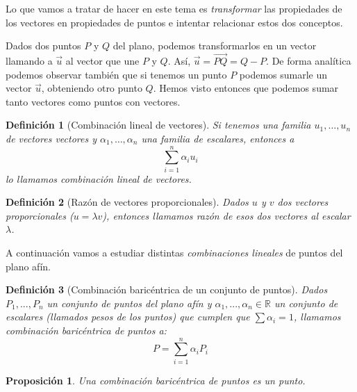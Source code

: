 \documentclass[11pt, a4paper, titlepage]{article}
\newcommand{\R}{\mathbb{R}}
\renewcommand{\vec}{\overrightarrow}
\theoremstyle{theorem-style}
\newtheorem*{nprop}{Proposición}
\theoremstyle{definition-style}
\newtheorem*{ndef}{Definición}
\theoremstyle{remark-style}
\theoremstyle{example-style}
\begin{document}
\begin{figure*}[h]
\centering
{}
\caption{El punto (2,3) en el plano}
\end{figure*}

Lo que vamos a tratar de hacer en este tema es \textit{transformar} las propiedades de los vectores en propiedades de puntos e intentar relacionar estos dos conceptos.

Dados dos puntos $P$ y $Q$ del plano, podemos transformarlos en un vector llamando a $\vec{u}$ al vector que une $P$ y $Q$. Así, $\vec{u} = \overrightarrow{PQ} = Q-P$. De forma analítica podemos observar también que si tenemos un punto $P$ podemos sumarle un vector $\vec{u}$, obteniendo otro punto $Q$. Hemos visto entonces que podemos sumar tanto vectores como puntos con vectores.


\begin{ndef}[Combinación lineal de vectores]
	Si tenemos una familia $u_1,\ldots , u_n$ de vectores vectores y $\alpha_1,\ldots, \alpha_n$ una familia de escalares, entonces a
	\[
	\sum_{i=1}^n \alpha_i u_i
	\]
	lo llamamos \textit{combinación lineal de vectores}.
\end{ndef}

\begin{ndef}[Razón de vectores proporcionales]
	Dados $u$ y $v$ dos vectores proporcionales ($u = \lambda v$), entonces llamamos \textit{razón} de esos dos vectores al escalar $\lambda$.
\end{ndef}

A continuación vamos a estudiar distintas \textit{combinaciones lineales} de puntos del plano afín.

\begin{ndef}[Combinación baricéntrica de un conjunto de puntos]
	Dados $P_1,...,P_n$ un conjunto de puntos del plano afín y $\alpha_1,...,\alpha_n \in \R$ un conjunto de escalares (llamados \textit{pesos} de los puntos) que cumplen que $\sum \alpha_i = 1$, llamamos \textit{combinación baricéntrica de puntos} a:
	\[
	P = \sum_{i=1}^n \alpha_i P_i
	\]
\end{ndef}

\begin{nprop} Una combinación baricéntrica de puntos es un punto. 
\end{nprop}
\end{document}
